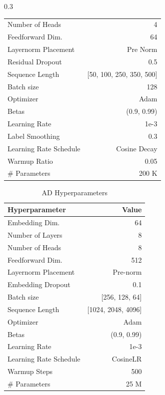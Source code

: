 \documentclass{article}
\begin{document}
\begin{table}[h!]
\begin{subtable}[h]{0.3\textwidth}
{\begin{tabular}{@{}lr@{}}
    Number of Heads                 & 4 \\
    Feedforward Dim.                & 64 \\
    Layernorm Placement             & Pre Norm \\
    Residual Dropout                & 0.5 \\
    \midrule
    Sequence Length                 & {[}50, 100, 250, 350, 500{]} \\
    \midrule
    Batch size                      & 128 \\
    Optimizer                       & Adam \\
    Betas                           & (0.9, 0.99) \\
    Learning Rate                   & 1e-3 \\
    Label Smoothing                 & 0.3 \\
    \bottomrule
    Learning Rate Schedule          & Cosine Decay \\
    Warmup Ratio                    & 0.05 \\
    \# Parameters                   & 200 K \\
    \bottomrule
    \end{tabular}
    }
\end{subtable}
\end{table}
\begin{table}[h!]
\centering
\caption{AD Hyperparameters}
\label{tab:ad-hyper}
\begin{tabular}{@{}lr@{}}
\toprule
\textbf{Hyperparameter} & \textbf{Value} \\ \midrule
Embedding Dim. & 64 \\
Number of Layers & 8 \\
Number of Heads & 8 \\
Feedforward Dim. & 512 \\
Layernorm Placement & Pre-norm \\
Embedding Dropout & 0.1 \\ \midrule
Batch size & {[}256, 128, 64{]} \\
Sequence Length & {[}1024, 2048, 4096{]} \\ \midrule
Optimizer & Adam \\
Betas & (0.9, 0.99) \\
Learning Rate & 1e-3 \\ \midrule
Learning Rate Schedule & CosineLR \\
Warmup Steps & 500 \\
\# Parameters & 25 M \\
\bottomrule
\end{tabular}
\end{table}
\end{document}
